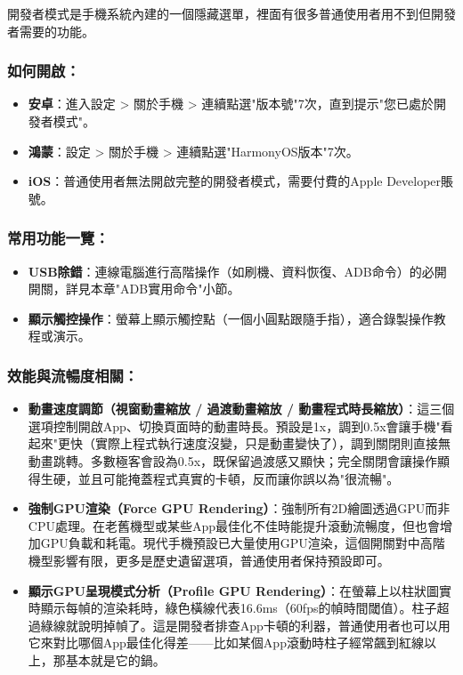 


開發者模式是手機系統內建的一個隱藏選單，裡面有很多普通使用者用不到但開發者需要的功能。

\subsubsection*{如何開啟：}

\begin{itemize}
  \item \textbf{安卓}：進入設定 > 關於手機 > 連續點選"版本號"7次，直到提示"您已處於開發者模式"。
  \item \textbf{鴻蒙}：設定 > 關於手機 > 連續點選"HarmonyOS版本"7次。
  \item \textbf{iOS}：普通使用者無法開啟完整的開發者模式，需要付費的Apple Developer賬號。
\end{itemize}

\subsubsection*{常用功能一覽：}

\begin{itemize}
  \item \textbf{USB除錯}：連線電腦進行高階操作（如刷機、資料恢復、ADB命令）的必開開關，詳見本章"ADB實用命令"小節。
  \item \textbf{顯示觸控操作}：螢幕上顯示觸控點（一個小圓點跟隨手指），適合錄製操作教程或演示。
\end{itemize}

\subsubsection*{效能與流暢度相關：}

\begin{itemize}
  \item \textbf{動畫速度調節（視窗動畫縮放 / 過渡動畫縮放 / 動畫程式時長縮放）}：這三個選項控制開啟App、切換頁面時的動畫時長。預設是1x，調到0.5x會讓手機"看起來"更快（實際上程式執行速度沒變，只是動畫變快了），調到關閉則直接無動畫跳轉。多數極客會設為0.5x，既保留過渡感又顯快；完全關閉會讓操作顯得生硬，並且可能掩蓋程式真實的卡頓，反而讓你誤以為"很流暢"。
  \item \textbf{強制GPU渲染（Force GPU Rendering）}：強制所有2D繪圖透過GPU而非CPU處理。在老舊機型或某些App最佳化不佳時能提升滾動流暢度，但也會增加GPU負載和耗電。現代手機預設已大量使用GPU渲染，這個開關對中高階機型影響有限，更多是歷史遺留選項，普通使用者保持預設即可。
  \item \textbf{顯示GPU呈現模式分析（Profile GPU Rendering）}：在螢幕上以柱狀圖實時顯示每幀的渲染耗時，綠色橫線代表16.6ms（60fps的幀時間閾值）。柱子超過綠線就說明掉幀了。這是開發者排查App卡頓的利器，普通使用者也可以用它來對比哪個App最佳化得差——比如某個App滾動時柱子經常飆到紅線以上，那基本就是它的鍋。
\end{itemize}


